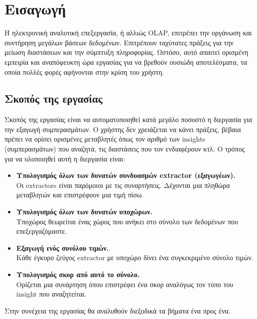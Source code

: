 \chapter{Εισαγωγή}
Η ηλεκτρονική αναλυτική επεξεργασία, ή αλλιώς OLAP, επιτρέπει την οργάνωση και συντήρηση μεγάλων βάσεων δεδομένων. Επιτρέπουν ταχύτατες πράξεις για την μείωση διαστάσεων και την σύμπτυξη πληροφορίας. Ωστόσο, αυτό απαιτεί ορισμένη εμπειρία και αναπόφευκτη ώρα εργασίας για να βρεθούν ουσιώδη αποτελέσματα, τα οποία πολλές φορές αφήνονται στην κρίση του χρήστη.


\section{Σκοπός της εργασίας}
Σκοπός της εργασίας είναι να αυτοματοποιηθεί κατά μεγάλο ποσοστό η διεργασία για την εξαγωγή συμπερασμάτων. Ο χρήστης δεν χρειάζεται να κάνει πράξεις, βέβαια πρέπει να ορίσει ορισμένες μεταβλητές όπως τον αριθμό των insights (συμπερασμάτων) που αναζητά, τις διαστάσεις που τον ενδιαφέρουν κτλ. Ο τρόπος για να υλοποιηθεί αυτή η διεργασία είναι:
\begin{itemize}
\item \textbf{Υπολογισμός όλων των δυνατών συνδυασμών extractor (εξαγωγέων).}\\ Οι extractors είναι παρόμοιοι με τις συναρτήσεις. Δέχονται μια πληθώρα μεταβλητών και επιστρέφουν μια τιμή πίσω.

\item \textbf{Υπολογισμός όλων των δυνατών υποχώρων.}\\ Υποχώρος θεωρείται ένας χώρος που ανήκει στο σύνολο των δεδομένων που επεξεργαζόμαστε.

\item \textbf{Εξαγωγή ενός συνόλου τιμών.}\\ Κάθε έγκυρο ζεύγος extractor με υποχώρο δίνει ένα συγκεκριμένο σύνολο τιμών.

\item \textbf{Υπολογισμός σκορ από αυτό το σύνολο.}\\ Ορίζεται μια συνάρτηση όπου επιστρέφει ένα σκορ αναλόγως τον τύπο του insight που αναζητείται.
\end{itemize}

Στην συνέχεια της εργασίας θα αναλυθούν διεξοδικά τα βήματα ένα προς ένα.


